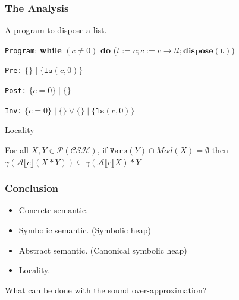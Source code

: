 \documentclass[aspectratio=1610, 13pt]{beamer}
\begin{document}
\begin{frame}\frametitle{The Analysis}
\begin{example}
    A program to dispose a list.
    
    \texttt{Program}: \textbf{while} $(c\ne0)$ \textbf{do} ($t:=c;c:=c\rightarrow tl;\mathbf{dispose(t)}$)
    
    \texttt{Pre:} $\{\}\mid\{\texttt{ls}(c,0)\}$
    
    \texttt{Post:} $\{c=0\}\mid \{\}$
    
    \texttt{Inv:} $\{c=0\}\mid \{\} \vee \{\}\mid \{\texttt{ls}(c,0)\}$
    \end{example}
\end{frame}

\begin{frame}{Locality}
	
    \begin{theorem}
    For all $X,Y\in \mathcal{P(CSH)}$, if $\texttt{Vars}(Y) \cap Mod(X) = \emptyset$ then $\gamma(\mathcal{A}\llbracket c\rrbracket(X*Y)) \subseteq \gamma(\mathcal{A}\llbracket c\rrbracket X)*Y$
    \end{theorem}
\end{frame}

\begin{frame}\frametitle{Conclusion}

\begin{itemize}
\item Concrete semantic.

\item Symbolic semantic. (Symbolic heap)

\item Abstract semantic. (Canonical symbolic heap)

\item Locality.

\end{itemize}

What can be done with the sound over-approximation?

\end{frame}
\end{document}

